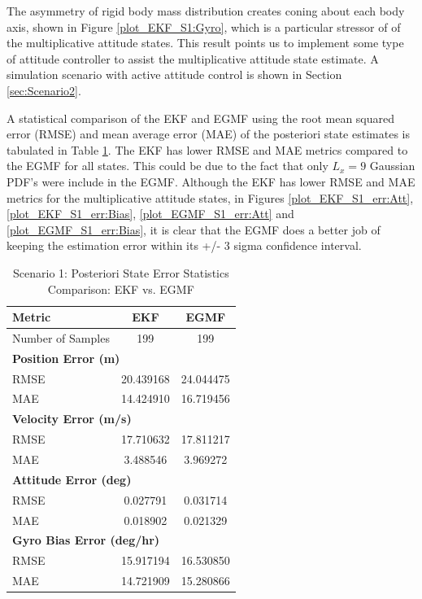 \documentclass[conf]{new-aiaa}
\begin{document}
The asymmetry of rigid body mass distribution creates coning about each body axis, shown in Figure \ref{plot_EKF_S1:Gyro}, which is a particular stressor of of the multiplicative attitude states. This result points us to implement some type of attitude controller to assist the multiplicative attitude state estimate. A simulation scenario with active attitude control is shown in Section \ref{sec:Scenario2}.



A statistical comparison of the EKF and EGMF using the root mean squared error (RMSE) and mean average error (MAE) of the posteriori state estimates is tabulated in Table \ref{tab:S1_ekf_egmf_stats}. The EKF has lower RMSE and MAE metrics compared to the EGMF for all states. This could be due to the fact that only $L_x=9$ Gaussian PDF's were include in the EGMF. Although the EKF has lower RMSE and MAE metrics for the multiplicative attitude states, in Figures \ref{plot_EKF_S1_err:Att}, \ref{plot_EKF_S1_err:Bias}, \ref{plot_EGMF_S1_err:Att} and \ref{plot_EGMF_S1_err:Bias}, it is clear that the EGMF does a better job of keeping the estimation error within its +/- 3 sigma confidence interval.

\begin{table}[h!]
\centering
\begin{tabular}{lcc}
\hline
\textbf{Metric} & \textbf{EKF} & \textbf{EGMF} \\
\hline
Number of Samples & 199 & 199 \\
\hline
\multicolumn{3}{l}{\textbf{Position Error (m)}} \\
RMSE & 20.439168 & 24.044475 \\
MAE  & 14.424910 & 16.719456 \\
\hline
\multicolumn{3}{l}{\textbf{Velocity Error (m/s)}} \\
RMSE & 17.710632 & 17.811217 \\
MAE  & 3.488546  & 3.969272 \\
\hline
\multicolumn{3}{l}{\textbf{Attitude Error (deg)}} \\
RMSE & 0.027791 & 0.031714 \\
MAE  & 0.018902 & 0.021329 \\
\hline
\multicolumn{3}{l}{\textbf{Gyro Bias Error (deg/hr)}} \\
RMSE & 15.917194 & 16.530850 \\
MAE  & 14.721909 & 15.280866 \\
\hline
\end{tabular}
\caption{Scenario 1: Posteriori State Error Statistics Comparison: EKF vs. EGMF}
\label{tab:S1_ekf_egmf_stats}
\end{table}
\end{document}
